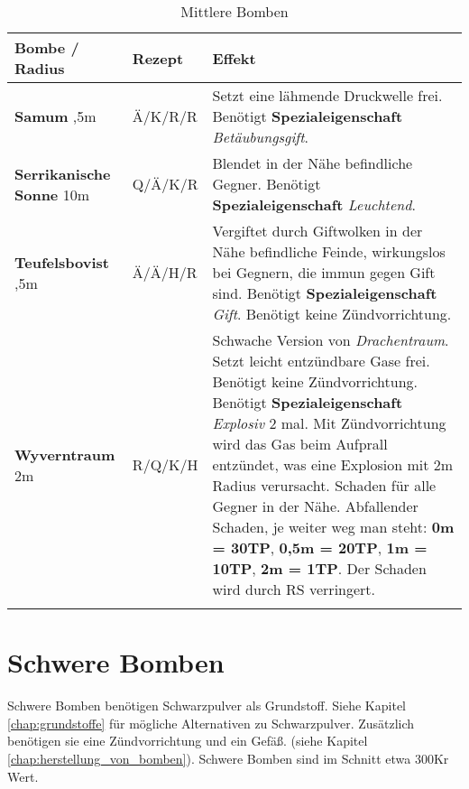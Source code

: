 \begin{longtable}{|p{4cm}|p{}|p{9cm}|}
\hline
\textbf{Bombe} / Radius & \textbf{Rezept} & \textbf{Effekt} \\ \hline

\textbf{Samum} \newline 2,5m & Ä/K/R/R & Setzt eine lähmende Druckwelle frei. Benötigt \textbf{Spezialeigenschaft} \textit{Betäubungsgift}. \\ \hline

\textbf{Serrikanische Sonne} \newline 10m & Q/Ä/K/R & Blendet in der Nähe befindliche Gegner. Benötigt \textbf{Spezialeigenschaft} \textit{Leuchtend}. \\ \hline

\textbf{Teufelsbovist} \newline 2,5m & Ä/Ä/H/R & Vergiftet durch Giftwolken in der Nähe befindliche Feinde, wirkungslos bei Gegnern, die immun gegen Gift sind. Benötigt \textbf{Spezialeigenschaft} \textit{Gift}. Benötigt keine Zündvorrichtung. \\ \hline

\textbf{Wyverntraum} \newline 2m & R/Q/K/H & Schwache Version von \textit{Drachentraum}. Setzt leicht entzündbare Gase frei. Benötigt keine Zündvorrichtung. Benötigt \textbf{Spezialeigenschaft} \textit{Explosiv} 2 mal. Mit Zündvorrichtung wird das Gas beim Aufprall entzündet, was eine Explosion mit 2m Radius verursacht. Schaden für alle Gegner in der Nähe. Abfallender Schaden, je weiter weg man steht: \textbf{0m = 30TP}, \textbf{0,5m = 20TP}, \textbf{1m = 10TP}, \textbf{2m = 1TP}. Der Schaden wird durch RS verringert. \\ \hline

\caption{Mittlere Bomben}
\label{tab:mittlere_bomben}
\end{longtable}


\section{Schwere Bomben}
Schwere Bomben benötigen Schwarzpulver als Grundstoff. Siehe Kapitel \ref{chap:grundstoffe} für mögliche Alternativen zu Schwarzpulver. Zusätzlich benötigen sie eine Zündvorrichtung und ein Gefäß. (siehe Kapitel \ref{chap:herstellung_von_bomben}). Schwere Bomben sind im Schnitt etwa 300Kr Wert.

